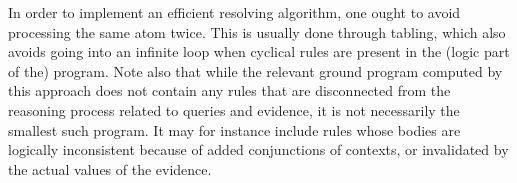 In order to implement an efficient resolving algorithm, one ought to avoid processing the same atom twice. This is usually done through tabling, which also avoids going into an infinite loop when cyclical rules are present in the (logic part of the) program. 
Note also that while the relevant ground program computed by this approach does not contain any rules that are disconnected from the reasoning process related to queries and evidence, it is not necessarily the smallest such program. It may for instance include rules whose bodies are logically inconsistent because of added conjunctions of contexts, or invalidated by the actual values of the evidence. 